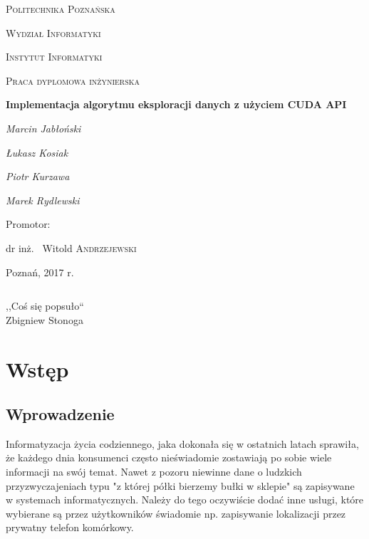 \documentclass[12pt]{article}
\begin{document}
\begin{titlepage}
	\centering
	{\scshape\LARGE Politechnika Poznańska \par}
	{\scshape\LARGE Wydział Informatyki \par}
	{\scshape\LARGE Instytut Informatyki \par}
	\vspace{1cm}
	{\scshape\Large Praca dyplomowa inżynierska\par}
	\vspace{1.5cm}
	{\huge\bfseries Implementacja algorytmu eksploracji danych z użyciem CUDA API\par}
	\vspace{2cm}
	{\Large\itshape Marcin Jabłoński \par}
	{\Large\itshape Łukasz Kosiak \par}
	{\Large\itshape Piotr Kurzawa \par}
	{\Large\itshape Marek Rydlewski \par}
	\vfill
	\begin{flushright}
	Promotor:\par
	dr inż. ~Witold \textsc{Andrzejewski}
	\end{flushright}
	\vfill
	{\large Poznań, 2017 r.\par}
\end{titlepage}
\thispagestyle{empty} %
$\mbox{ }$
\vfill\vfill
\hfill
\begin{flushright}
\begin{em}
,,Coś się popsuło`` \\
Zbigniew Stonoga
\end{em}
\end{flushright}
\vfill\pagebreak
\tableofcontents
\newpage

\section{Wstęp}

\subsection{Wprowadzenie}
Informatyzacja życia codziennego, jaka dokonała się w ostatnich latach sprawiła, że każdego dnia konsumenci często nieświadomie zostawiają po sobie wiele informacji na swój temat. Nawet z pozoru niewinne dane o ludzkich przyzwyczajeniach typu "z której półki bierzemy bułki w sklepie" są zapisywane w systemach informatycznych. Należy do tego oczywiście dodać inne usługi, które wybierane są przez użytkowników świadomie np. zapisywanie lokalizacji przez prywatny telefon komórkowy.
\end{document}
